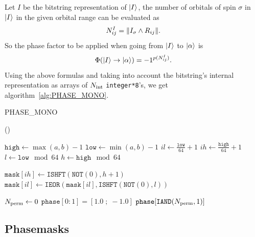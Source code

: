 \documentclass[./thesis.tex]{subfiles}
\begin{document}
Let $I$ be the bitstring representation of ${\ket{I}}$, the number of orbitals of spin $\sigma$ in ${\ket{I}}$ in the given orbital range can be evaluated as
\begin{equation}
N^{I}_{ij} = \norm{I_{\sigma} \wedge R_{ij}}.
\end{equation}
So the phase factor to be applied when going from ${\ket{I}}$ to ${\ket{\alpha}}$ is 
\begin{equation}
{\Phi \qty({\ket{I}}\rightarrow {\ket{\alpha}})} = -1^{p(N^I_{ij})}.
\end{equation}
Using the above formulas and taking into account the bitstring's internal representation as arrays of ${N_\text{int}}$ \lstinline{integer*8}'s, we get algorithm~\ref{alg:PHASE_MONO}.   


\begin{algorithm}
	\caption{PHASE\_MONO}	
	\label{alg:PHASE_MONO}
	
	\Fn(){}{
		$\texttt{high} \gets \max(a,b)-1$ \;
		$\texttt{low} \gets \min(a,b)-1$ \;
		$il \gets \frac{\texttt{low}}{64} + 1$ \;
		$ih \gets \frac{\texttt{high}}{64} + 1$ \;
		$l \gets \texttt{low} \mod 64$ \;
		$h \gets \texttt{high} \mod 64$ \; 

		
		$\texttt{mask}[ih] \gets \texttt{ISHFT}(\texttt{NOT}(0), h+1)$ \;
		$\texttt{mask}[il] \gets \texttt{IEOR}(\texttt{mask}[il], \texttt{ISHFT}(\texttt{NOT}(0), l))$ \;
		
		
		${N_\text{perm}} \gets 0$ \;
                $\texttt{phase}[0:1] = [ 1.0 \;;\; -1.0 ]$ \;
                \KwRet $\texttt{phase}[\texttt{IAND}({N_\text{perm}},1)]$ \;
		}
\end{algorithm}


\subsection{Phasemasks}
\end{document}
